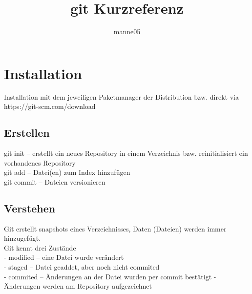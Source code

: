 \documentclass[11pt, oneside]{article}   	%
\title{git Kurzreferenz}
\author{manne05}
\date{}							%
\begin{document}
\maketitle
\section{Installation}
Installation mit dem jeweiligen Paketmanager der Distribution bzw. direkt via https://git-scm.com/download
\subsection{Erstellen}
git init    -- erstellt ein neues Repository in einem Verzeichnis bzw. reinitialisiert ein vorhandenes Repository  \\
git add   -- Datei(en) zum Index hinzufügen \\
git commit   -- Dateien versionieren \\

\subsection{Verstehen}
Git erstellt snapshots eines Verzeichnisses, Daten (Dateien) werden immer hinzugefügt. \\
Git kennt drei Zustände \\
- modified -- eine Datei wurde verändert\\
- staged    -- Datei geaddet, aber noch nicht commited \\
- commited -- Änderungen an der Datei wurden per commit bestätigt - Änderungen werden am Repository aufgezeichnet
\end{document}
